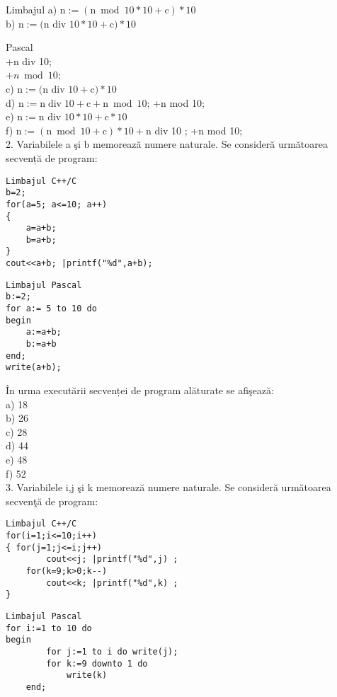 Limbajul a) $\mathrm{n}:=(\mathrm{n} \bmod 10 * 10+\mathrm{c}) * 10$\\
b) $\mathrm{n}:=(\mathrm{n}$ div $10 * 10+\mathrm{c}) * 10$

Pascal\\
+n div 10;\\
$+n \bmod 10$;\\
c) $\mathrm{n}:=(\mathrm{n}$ div $10+\mathrm{c}) * 10$\\
d) $\mathrm{n}:=\mathrm{n} \operatorname{div} 10+\mathrm{c}+\mathrm{n} \bmod 10$; +n mod 10;\\
e) $\mathrm{n}:=\mathrm{n}$ div $10 * 10+\mathrm{c} * 10$\\
f) $\mathrm{n}:=(\mathrm{n} \bmod 10+\mathrm{c}) * 10+\mathrm{n}$ div 10 ; +n mod 10;\\
2. Variabilele a şi b memorează numere naturale. Se consideră următoarea secvență de program:

\begin{verbatim}
Limbajul C++/C
b=2;
for(a=5; a<=10; a++)
{
    a=a+b;
    b=a+b;
}
cout<<a+b; |printf("%d",a+b);
\end{verbatim}

\begin{verbatim}
Limbajul Pascal
b:=2;
for a:= 5 to 10 do
begin
    a:=a+b;
    b:=a+b
end;
write(a+b);
\end{verbatim}

În urma executării secvenței de program alăturate se afişează:\\
a) 18\\
b) 26\\
c) 28\\
d) 44\\
e) 48\\
f) 52\\
3. Variabilele i,j şi k memorează numere naturale. Se consideră următoarea secvenţă de program:

\begin{verbatim}
Limbajul C++/C
for(i=1;i<=10;i++)
{ for(j=1;j<=i;j++)
        cout<<j; |printf("%d",j) ;
    for(k=9;k>0;k--)
        cout<<k; |printf("%d",k) ;
}
\end{verbatim}

\begin{verbatim}
Limbajul Pascal
for i:=1 to 10 do
begin
        for j:=1 to i do write(j);
        for k:=9 downto 1 do
            write(k)
    end;
\end{verbatim}

